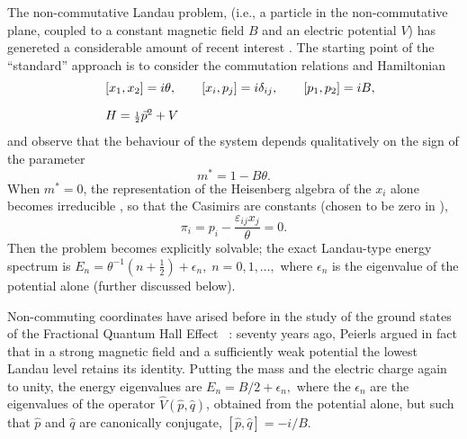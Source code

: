 \documentclass[a4paper,11pt]{article}
\let\ssection=\section
\renewcommand{\section}{\setcounter{equation}{0}\ssection}
\newcommand{\half}{{\scriptstyle{\frac{1}{2}}}}
\def\vp{{\vec p}}
\begin{document}
The non-commutative Landau problem,
(i.e., a particle in the non-commutative plane,
coupled to a constant magnetic field $B$ and an electric potential
$V$) has genereted a  considerable amount of recent interest
\cite{DJT, DuJa, DH, NaPo, GAMB, Sochi, BNS}. The starting point of
the ``standard'' approach \cite{NaPo, GAMB, Sochi, BNS} is
to consider the commutation relations and Hamiltonian
\begin{equation}
     \begin{array}{ll}
	&[x_{1}, x_{2}]=i\theta,
	\qquad
	[x_{i},p_{j}]=i\delta_{ij},
	\qquad
	[p_{1}, p_{2}]=iB,\hfill
	\\[10pt]
	&H=\half{\vp^2}+V\hfill
  \end{array}
  \label{BNSrel}
\end{equation}
and observe that the
behaviour of the system depends qualitatively on the sign of the
parameter
\begin{equation}
     m^*=
     1-B\theta.
\label{BNSeffmass}
\end{equation}
When $m^*=0$, the representation of the Heisenberg algebra of the
$x_{i}$ alone becomes irreducible \cite{Sochi}, so that the Casimirs
are constants (chosen to be zero in \cite{BNS}),
\begin{equation}
     \pi_{i}=p_{i}-\frac{\varepsilon_{ij}x_{j}}{\theta}=0.
     \label{casimir}
\end{equation}
  Then the problem becomes explicitly solvable;
the exact Landau-type energy spectrum is
$
E_{n}=\theta^{-1}(n+\half)+\epsilon_{n},
\;  n=0,1,\dots,
$
where $\epsilon_{n}$ is the eigenvalue of the potential
alone \cite{BNS} (further discussed below).
\goodbreak


Non-commuting coordinates have arised before
in the study of the ground states of the Fractional Quantum
Hall Effect \cite{QHE, GJ}~: seventy years ago,
Peierls \cite{Peierls} argued in fact that
   in a strong  magnetic field and a sufficiently
  weak  potential the lowest  Landau level retains its identity.
Putting the mass and the electric charge  again
  to unity, the energy eigenvalues are
$
E_{n}={B}/{2}+\epsilon_{n},
$
where the
$\epsilon_{n}$ are the eigenvalues of the operator
$\hat{V}(\hat{p},\hat{q})$, obtained from the
potential alone, but such that $\hat{p}$ and $\hat{q}$ are
canonically conjugate,
$
[\hat{p},\hat{q}]=-i/B.
$
\end{document}
